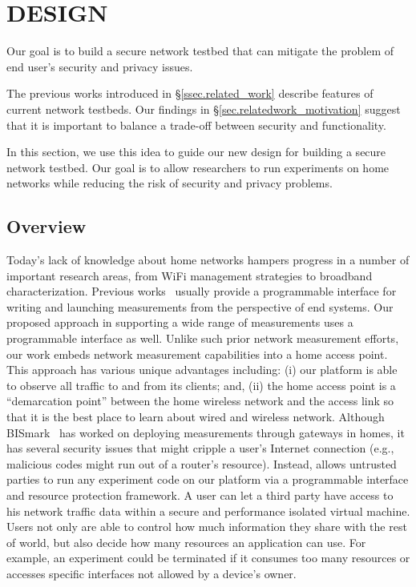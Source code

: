 \chapter{\sysname DESIGN}
\label{sec.design}
Our goal is to build a secure network testbed that can mitigate the problem 
of end user's security and privacy issues. 

The previous works introduced in \S{\ref{ssec.related_work}} describe features of current network testbeds. Our findings in \S{\ref{sec.relatedwork_motivation}} suggest that it is important to balance a trade-off between security and functionality.

In this section, we use this idea to guide our new design for building a secure network testbed. Our goal is to allow researchers to run experiments on home networks while reducing the risk of security and privacy problems.

\section{Overview}
Today's lack of knowledge about home networks hampers progress in a number of important research areas, from WiFi management strategies to broadband characterization. Previous works~\cite{sanchez2014measurement,dhawan2012fathom} usually provide a programmable interface for writing and launching measurements from the perspective of end systems. Our proposed approach in supporting a wide range of measurements uses a programmable interface as well. Unlike such prior network measurement efforts, our work embeds network measurement capabilities into a home access point. This approach has various unique advantages including: (i) our platform is able to observe all traffic to and from its clients; and, (ii) the home access point is a ``demarcation point'' between the home wireless network and the access link so that it is the best place to learn about wired and wireless network. Although BISmark~\cite{183951} has worked on deploying measurements through gateways in homes, it has several security issues that might cripple a user's Internet connection (e.g., malicious codes might run out of a router's resource). Instead, \sysname allows untrusted parties to run any experiment code on our platform via a programmable interface and resource protection framework. A user can let a third party have access to his network traffic data within a secure and performance isolated virtual machine. Users not only are able to control how much information they share with the rest of world, but also decide how many resources an application can use. For example, an experiment could be terminated if it consumes too many resources or accesses specific interfaces not allowed by a device's owner. 

